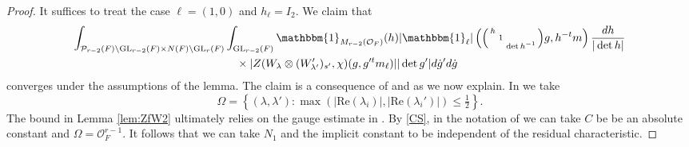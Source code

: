 \documentclass[12pt]{amsart}
\theoremstyle{remark}
\numberwithin{equation}{section}
\newcommand{\GL}{\mathrm{GL}}
\newcommand{\OO}{\mathcal{O}}
\theoremstyle{definition}
\newenvironment{psmatrix}
  {\left(\begin{smallmatrix}}
  {\end{smallmatrix}\right)}
\numberwithin{equation}{subsection}
\newcommand{\one}{\mathbbm{1}}
\begin{document}
\begin{proof}
It suffices to treat the case $\ell=(1,0)$ and $h_\ell=I_2.$ 
We claim that 
\begin{align*} 
\begin{split}
    \int_{\mathcal{P}_{r-2}(F) \backslash \GL_{r-2}(F) \times N(F) \backslash \GL_r(F)} &\int_{\GL_{r-2}(F)}\one_{M_{r-2}(\OO_F)}(h)|\one_{\ell}|\left(\begin{psmatrix}h & \\ & 1 & \\  & & \det h^{-1}
\end{psmatrix}g,h^{-t}m\right)\frac{dh}{|\det h|}\\
&\quad\times
    |Z(W_\lambda\otimes (W'_{\lambda'})_{s'},\chi)(g,g'^tm_\ell)|
    |\det g'|d\dot{g}'d\dot{g}
    \end{split}
\end{align*}
converges under the assumptions of the lemma. The claim is a consequence of  and  as we now explain.  In   we take 
$$
\Omega=\left\{(\lambda,\lambda'):\max\left(|\mathrm{Re}(\lambda_i)|,|\mathrm{Re}(\lambda_i')|\right) \leq \tfrac{1}{2}\right\}.
$$
The bound in Lemma \ref{lem:ZfW2} ultimately relies on the gauge estimate in . By \eqref{CS}, in the notation of  we can take $C$ be be an absolute constant and $\Omega=\OO_F^{r-1}.$  It follows
that we can take $N_1$ and the implicit constant to be independent of the residual characteristic.




\end{proof}
\end{document}
